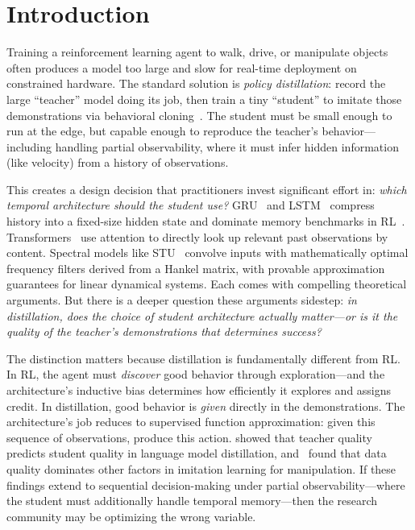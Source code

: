 \chapter{Introduction}
\label{ch:intro}

Training a reinforcement learning agent to walk, drive, or manipulate objects often produces a model too large and slow for real-time deployment on constrained hardware.
The standard solution is \emph{policy distillation}: record the large ``teacher'' model doing its job, then train a tiny ``student'' to imitate those demonstrations via behavioral cloning~\citep{hinton2015distilling, rusu2016policy}.
The student must be small enough to run at the edge, but capable enough to reproduce the teacher's behavior---including handling partial observability, where it must infer hidden information (like velocity) from a history of observations.

This creates a design decision that practitioners invest significant effort in: \emph{which temporal architecture should the student use?}
GRU~\citep{cho2014gru} and LSTM~\citep{hochreiter1997lstm} compress history into a fixed-size hidden state and dominate memory benchmarks in RL~\citep{morad2023popgym}.
Transformers~\citep{chen2021decision} use attention to directly look up relevant past observations by content.
Spectral models like STU~\citep{agarwal2024spectral, liu2025flashstu} convolve inputs with mathematically optimal frequency filters derived from a Hankel matrix, with provable approximation guarantees for linear dynamical systems.
Each comes with compelling theoretical arguments.
But there is a deeper question these arguments sidestep: \emph{in distillation, does the choice of student architecture actually matter---or is it the quality of the teacher's demonstrations that determines success?}

The distinction matters because distillation is fundamentally different from RL.
In RL, the agent must \emph{discover} good behavior through exploration---and the architecture's inductive bias determines how efficiently it explores and assigns credit.
In distillation, good behavior is \emph{given} directly in the demonstrations.
The architecture's job reduces to supervised function approximation: given this sequence of observations, produce this action.
\citet{busbridge2025distillation} showed that teacher quality predicts student quality in language model distillation, and~\citet{belkhale2023data} found that data quality dominates other factors in imitation learning for manipulation.
If these findings extend to sequential decision-making under partial observability---where the student must additionally handle temporal memory---then the research community may be optimizing the wrong variable.

